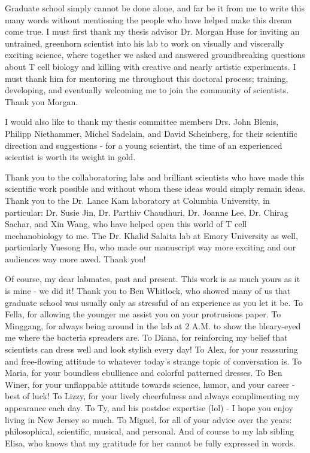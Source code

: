 \documentclass[phd,tocprelim]{cornell}
\begin{document}
\begin{acknowledgements}
Graduate school simply cannot be done alone, and far be it from me to write this many words without mentioning the people who have helped make this dream come true. I must first thank my thesis advisor Dr. Morgan Huse for inviting an untrained, greenhorn scientist into his lab to work on visually and viscerally exciting science, where together we asked and answered groundbreaking questions about T cell biology and killing with creative and nearly artistic experiments. I must thank him for mentoring me throughout this doctoral process; training, developing, and eventually welcoming me to join the community of scientists. Thank you Morgan.

I would also like to thank my thesis committee members Drs. John Blenis, Philipp Niethammer, Michel Sadelain, and  David Scheinberg, for their scientific direction and suggestions - for a young scientist, the time of an experienced scientist is worth its weight in gold. 

Thank you to the collaboratoring labs and brilliant scientists who have made this scientific work possible and without whom these ideas would simply remain ideas. Thank you to the Dr. Lance Kam laboratory at Columbia University, in particular: Dr. Susie Jin, Dr. Parthiv Chaudhuri,  Dr. Joanne Lee, Dr. Chirag Sachar, and Xin Wang, who have helped open this world of T cell mechanobiology to me. The Dr. Khalid Salaita lab at Emory University as well, particularly Yuesong Hu, who made our manuscript way more exciting and our audiences way more awed. Thank you!

Of course, my dear labmates, past and present. This work is as much yours as it is mine - we did it! Thank you to Ben Whitlock, who showed many of us that graduate school was usually only as stressful of an experience as you let it be. To Fella, for allowing the younger me assist you on your protrusions paper. To Minggang, for always being around in the lab at 2 A.M. to show the bleary-eyed me where the bacteria spreaders are. To Diana, for reinforcing my belief that scientists can dress well and look stylish every day! To Alex, for your reassuring and free-flowing attitude to whatever today's strange topic of conversation is. To Maria, for your boundless ebullience and colorful patterned dresses. To Ben Winer, for your unflappable attitude towards science, humor, and your career - best of luck! To Lizzy, for your lively cheerfulness and always complimenting my appearance each day. To Ty, and his postdoc expertise (lol) - I hope you enjoy living in New Jersey so much. To Miguel, for all of your advice over the years: philosophical, scientific, musical, and personal. And of course to my lab sibling Elisa, who knows that my gratitude for her cannot be fully expressed in words. 


\end{acknowledgements}
\end{document}
